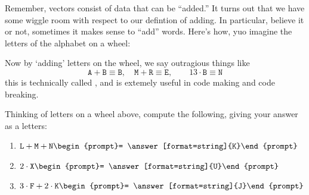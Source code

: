 \documentclass{ximera}
\begin{document}
Remember, vectors consist of data that can be ``added.'' It turns out
that we have some wiggle room with respect to our defintion of
adding. In particular, believe it or not, sometimes it makes sense to
``add'' words. Here's how, yuo imagine the letters of the alphabet on
a wheel:
\begin{center}
\end{center}
Now by `adding' letters on the wheel, we say outragious things like
\[
\texttt{A}+ \texttt{B} \equiv \texttt{B}, \quad \texttt{M}+\texttt{R} \equiv \texttt{E}, \qquad 13\cdot \texttt{B} \equiv \texttt{N}
\]
this is technically called , and
is extemely useful in code making and code breaking.

\begin{question}
  Thinking of letters on a wheel above, compute the following, giving your answer as a letters:
  \begin{enumerate}
    \item $\texttt{L} + \texttt{M} + \texttt{N} \begin{prompt}= \answer[format=string]{K}\end{prompt}$
    \item $2\cdot \texttt{X} \begin{prompt}= \answer[format=string]{U}\end{prompt}$
    \item $3\cdot \texttt{F} + 2\cdot\texttt{K} \begin{prompt}= \answer[format=string]{J}\end{prompt}$
    \pdfOnly{\end{multicols}}
  \end{enumerate}
\end{question}
\end{document}
